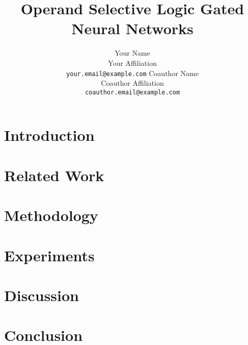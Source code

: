 \documentclass{article}
\title{Operand Selective Logic Gated Neural Networks}
\author{
  Your Name \\
  Your Affiliation \\
  \texttt{your.email@example.com}
  \And
  Coauthor Name \\
  Coauthor Affiliation \\
  \texttt{coauthor.email@example.com}
}
\begin{document}
\maketitle



\section{Introduction}


\section{Related Work}


\section{Methodology}


\section{Experiments}


\section{Discussion}


\section{Conclusion}





\appendix

\end{document}
